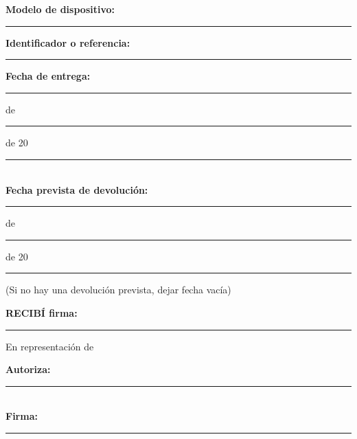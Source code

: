{\begin{minipage}{\textwidth}
{      \vspace{1em}

      \noindent \textbf{Modelo de dispositivo:} \rule{6.5cm}{0.4pt} \hfill

      \textbf{Identificador o referencia:} \rule{6.5cm}{0.4pt}

      \vspace{1em}

      \noindent \textbf{Fecha de entrega:} \rule{1cm}{0.4pt} de \rule{2cm}{0.4pt} de 20\rule{1cm}{0.4pt} \\

      \noindent \textbf{Fecha prevista de devolución:} \rule{1cm}{0.4pt} de \rule{2cm}{0.4pt} de 20\rule{1cm}{0.4pt}

      (Si no hay una devolución prevista, dejar fecha vacía)

      \vspace{2em}

      \noindent \textbf{RECIBÍ firma:} \rule{10cm}{0.4pt}

      \vspace{2em}

      En representación de \Beneficiario

      \noindent \textbf{Autoriza:} \rule{5cm}{0.4pt}  \\
      \textbf{Firma:} \rule{6cm}{0.4pt}

      \vfill
    }
    \label{tab:guia-sgsi-plantilla-firma-recepcion-dispositivo}
  \end{minipage}
}